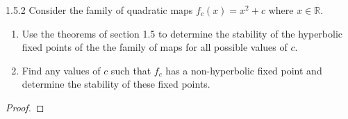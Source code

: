 \begin{problem}{1.5.2}
  Consider the family of quadratic maps $f_c(x) = x^2 + c$ where $x\in\mathbb{R}$.
  \begin{enumerate}
    \item Use the theorems of section 1.5 to determine the stability of the hyperbolic fixed points of the
      the family of maps for all possible values of $c$.
    \item Find any values of $c$ such that $f_c$ has a non-hyperbolic fixed point and
      determine the stability of these fixed points.
  \end{enumerate}
\end{problem}

\begin{proof}
\end{proof}
\newpage
